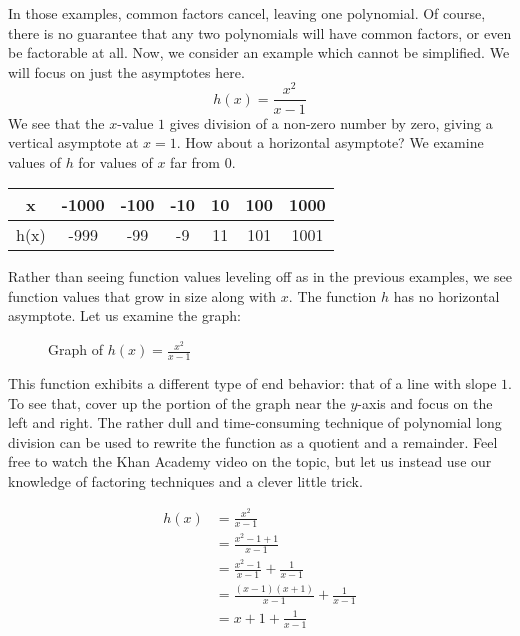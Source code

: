 In those examples, common factors cancel, leaving one polynomial. Of course, there is no guarantee that any two polynomials will have common factors, or even be factorable at all. Now, we consider an example which cannot be simplified. We will focus on just the asymptotes here.
\[ h(x) = \frac{x^2}{x - 1} \]
We see that the \( x \)-value \( 1 \) gives division of a non-zero number by zero, giving a vertical asymptote at \( x = 1 \). How about a horizontal asymptote? We examine values of \( h \) for values of \( x \) far from \( 0 \).

\begin{center}
\begin{tabular}{ |c|c|c|c|c|c|c| } 
 \hline
 x & -1000 & -100 & -10 & 10 & 100 & 1000 \\ 
 \hline
 h(x) & -999 & -99 & -9 & 11 & 101 & 1001 \\ 
 \hline
\end{tabular}
\end{center}

Rather than seeing function values leveling off as in the previous examples, we see function values that grow in size along with \( x \). The function \( h \) has no horizontal asymptote. Let us examine the graph:

\begin{figure}[htbp]
  \centering
  \caption{Graph of \( h(x) = \frac{x^2}{x - 1} \)}
\end{figure}

This function exhibits a different type of end behavior: that of a line with slope \( 1 \). To see that, cover up the portion of the graph near the \( y \)-axis and focus on the left and right. The rather dull and time-consuming technique of polynomial long division can be used to rewrite the function as a quotient and a remainder. Feel free to watch the Khan Academy video on the topic, but let us instead use our knowledge of factoring techniques and a clever little trick.

\begin{equation} \label{eq1}
\begin{split}
h(x) & = \frac{x^2}{x - 1} \\
& = \frac{x^2 - 1 + 1}{x - 1} \\ 
& = \frac{x^2 - 1}{x - 1} + \frac{1}{x - 1} \\
& = \frac{(x - 1)(x + 1)}{x - 1} + \frac{1}{x - 1} \\
& = x + 1 + \frac{1}{x - 1}
\end{split}
\end{equation}


